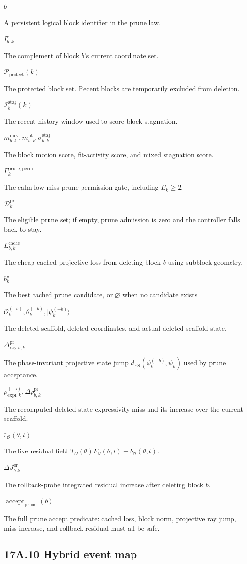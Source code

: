 \documentclass[10pt]{article}
\newcommand{\sym}[2]{%
  \noindent\begin{minipage}[t]{0.29\textwidth}\raggedright\textbf{\ensuremath{#1}}\end{minipage}%
  \hfill
  \begin{minipage}[t]{0.68\textwidth}\raggedright #2\end{minipage}\par\vspace{0.22em}}
\begin{document}
\sym{b}{A persistent logical block identifier in the prune law.}
\sym{I_{b,k}^{c}}{The complement of block $b$'s current coordinate set.}
\sym{\mathcal P_{\mathrm{protect}}(k)}{The protected block set. Recent blocks are temporarily excluded from deletion.}
\sym{\mathcal I_b^{\mathrm{stag}}(k)}{The recent history window used to score block stagnation.}
\sym{m_{b,k}^{\mathrm{mov}},m_{b,k}^{\mathrm{fit}},\sigma_{b,k}^{\mathrm{stag}}}{The block motion score, fit-activity score, and mixed stagnation score.}
\sym{\Gamma_k^{\mathrm{prune,perm}}}{The calm low-miss prune-permission gate, including $B_k\ge2$.}
\sym{\mathcal D_k^{\mathrm{pr}}}{The eligible prune set; if empty, prune admission is zero and the controller falls back to stay.}
\sym{L_{b,k}^{\mathrm{cache}}}{The cheap cached projective loss from deleting block $b$ using subblock geometry.}
\sym{b_k^\star}{The best cached prune candidate, or $\varnothing$ when no candidate exists.}
\sym{\mathcal O_k^{(-b)},\theta_k^{(-b)},|\psi_k^{(-b)}\rangle}{The deleted scaffold, deleted coordinates, and actual deleted-scaffold state.}
\sym{\Delta_{\mathrm{ray},b,k}^{\mathrm{pr}}}{The phase-invariant projective state jump $d_{\mathrm{FS}}(\psi_k^{(-b)},\psi_k)$ used by prune acceptance.}
\sym{\rho_{\mathrm{expr},k}^{(-b)},\Delta\rho_{b,k}^{\mathrm{pr}}}{The recomputed deleted-state expressivity miss and its increase over the current scaffold.}
\sym{\bar r_{\mathcal O}(\theta,t)}{The live residual field $\bar T_{\mathcal O}(\theta)F_{\mathcal O}(\theta,t)-\bar b_{\mathcal O}(\theta,t)$.}
\sym{\Delta J_{b,k}^{\mathrm{pr}}}{The rollback-probe integrated residual increase after deleting block $b$.}
\sym{\operatorname{accept}_{\mathrm{prune}}(b)}{The full prune accept predicate: cached loss, block norm, projective ray jump, miss increase, and rollback residual must all be safe.}

\subsection*{17A.10 Hybrid event map}
\end{document}
